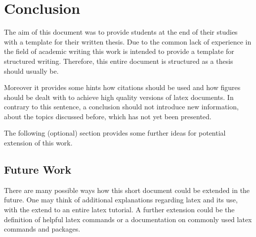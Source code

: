 
\chapter{Conclusion}
\label{sect:conclusion}
		

The aim of this document was to provide students at the end of their studies with a template for their written thesis.
Due to the common lack of experience in the field of academic writing this work is intended to provide a template for structured writing.
Therefore, this entire document is structured as a thesis should usually be.

Moreover it provides some hints how citations should be used and how figures should be dealt with to achieve high quality versions of latex documents.
In contrary to this sentence, a conclusion should not introduce new information, about the topics discussed before, which has not yet been presented.

The following (optional) section provides some further ideas for potential extension of this work.

\section{Future Work} %


There are many possible ways how this short document could be extended in the future.
One may think of additional explanations regarding latex and its use, with the extend to an entire latex tutorial.
A further extension could be the definition of helpful latex commands or a documentation on commonly used latex commands and packages.